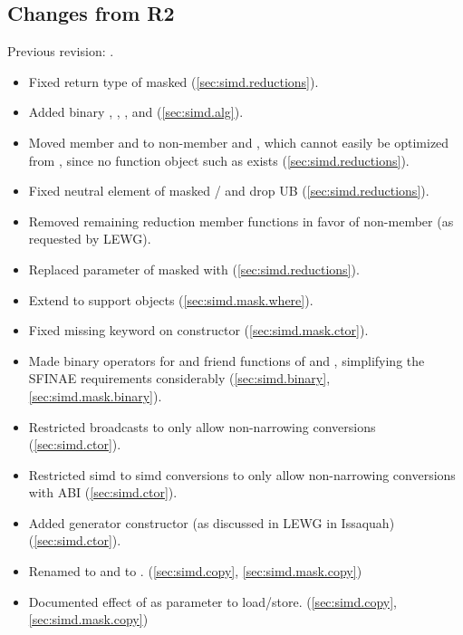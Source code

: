 \subsection{Changes from R2}
Previous revision: \parencite{P0214R2}.
\begin{itemize}
    \item Fixed return type of masked  (\ref{sec:simd.reductions}).
    \item Added binary , , , and  (\ref{sec:simd.alg}).
    \item Moved member  and  to non-member  and , which cannot easily be optimized from , since no function object such as  exists (\ref{sec:simd.reductions}).
    \item Fixed neutral element of masked / and drop UB (\ref{sec:simd.reductions}).
    \item Removed remaining reduction member functions in favor of non-member  (as requested by LEWG).
    \item Replaced  parameter of masked  with  (\ref{sec:simd.reductions}).
    \item Extend  to support \const \simd objects (\ref{sec:simd.mask.where}).
    \item Fixed missing  keyword on  constructor (\ref{sec:simd.mask.ctor}).
    \item Made binary operators for \simd and \mask friend functions of \simd and \mask, simplifying the SFINAE requirements considerably (\ref{sec:simd.binary}, \ref{sec:simd.mask.binary}).
    \item Restricted broadcasts to only allow non-narrowing conversions (\ref{sec:simd.ctor}).
    \item Restricted simd to simd conversions to only allow non-narrowing conversions with  ABI (\ref{sec:simd.ctor}).
    \item Added generator constructor (as discussed in LEWG in Issaquah) (\ref{sec:simd.ctor}).
    \item Renamed  to  and  to . (\ref{sec:simd.copy}, \ref{sec:simd.mask.copy})
    \item Documented effect of  as  parameter to load/store. (\ref{sec:simd.copy}, \ref{sec:simd.mask.copy})

\end{itemize}
